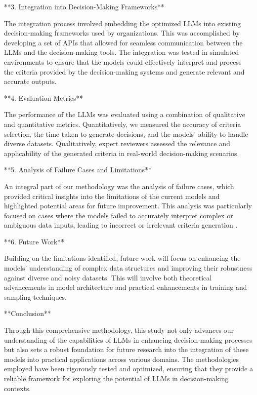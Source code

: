 \documentclass[conference]{IEEEtran}
\begin{document}
**3. Integration into Decision-Making Frameworks**

The integration process involved embedding the optimized LLMs into existing decision-making frameworks used by organizations. This was accomplished by developing a set of APIs that allowed for seamless communication between the LLMs and the decision-making tools. The integration was tested in simulated environments to ensure that the models could effectively interpret and process the criteria provided by the decision-making systems and generate relevant and accurate outputs.

**4. Evaluation Metrics**

The performance of the LLMs was evaluated using a combination of qualitative and quantitative metrics. Quantitatively, we measured the accuracy of criteria selection, the time taken to generate decisions, and the models' ability to handle diverse datasets. Qualitatively, expert reviewers assessed the relevance and applicability of the generated criteria in real-world decision-making scenarios.

**5. Analysis of Failure Cases and Limitations**

An integral part of our methodology was the analysis of failure cases, which provided critical insights into the limitations of the current models and highlighted potential areas for future improvement. This analysis was particularly focused on cases where the models failed to accurately interpret complex or ambiguous data inputs, leading to incorrect or irrelevant criteria generation \cite{fan2016}.

**6. Future Work**

Building on the limitations identified, future work will focus on enhancing the models' understanding of complex data structures and improving their robustness against diverse and noisy datasets. This will involve both theoretical advancements in model architecture and practical enhancements in training and sampling techniques.

**Conclusion**

Through this comprehensive methodology, this study not only advances our understanding of the capabilities of LLMs in enhancing decision-making processes but also sets a robust foundation for future research into the integration of these models into practical applications across various domains. The methodologies employed have been rigorously tested and optimized, ensuring that they provide a reliable framework for exploring the potential of LLMs in decision-making contexts.
\end{document}
